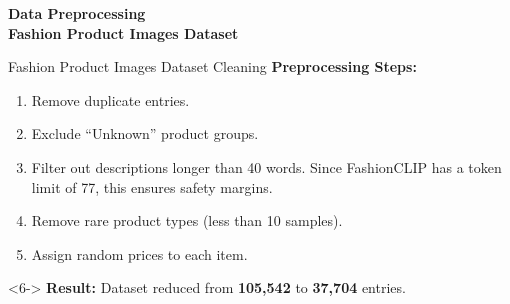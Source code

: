 \begin{frame}{}
  \Huge
  \centering
  \textbf{Data Preprocessing} \\
  \normalsize
  \vspace{1em}
  \textbf{Fashion Product Images Dataset}
  \normalsize
\end{frame}

\begin{frame}{Fashion Product Images Dataset Cleaning}
  \textbf{Preprocessing Steps:}
  \begin{enumerate}
      \item<1-> Remove duplicate entries.
      \item<2-> Exclude ``Unknown'' product groups.
      \item<3-> Filter out descriptions longer than 40 words. Since FashionCLIP has a token limit of 77, this ensures safety margins.
      \item<4-> Remove rare product types (less than 10 samples).
      \item<5-> Assign random prices to each item.
  \end{enumerate}

  \begin{block}<6->{}
    \textbf{Result: }Dataset reduced from \textbf{105,542} to \textbf{37,704} entries.
  \end{block}
\end{frame}
